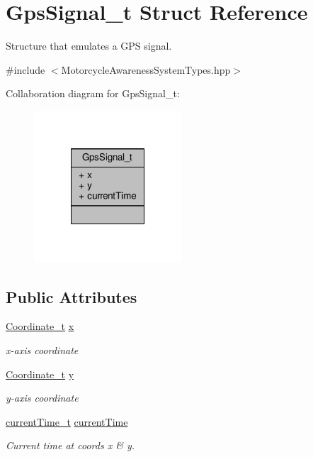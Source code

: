 \hypertarget{structGpsSignal__t}{\section{Gps\-Signal\-\_\-t Struct Reference}
\label{structGpsSignal__t}
}


Structure that emulates a G\-P\-S signal.  




{\ttfamily \#include $<$Motorcycle\-Awareness\-System\-Types.\-hpp$>$}



Collaboration diagram for Gps\-Signal\-\_\-t\-:\nopagebreak
\begin{figure}[H]
\begin{center}
\leavevmode
\includegraphics[width=156pt]{structGpsSignal__t__coll__graph}
\end{center}
\end{figure}
\subsection*{Public Attributes}
\begin{DoxyCompactItemize}
\item 
\hyperlink{MotorcycleAwarenessSystemTypes_8hpp_ae989615510617e9b0ad39dcd343c78fb}{Coordinate\-\_\-t} \hyperlink{structGpsSignal__t_a6f7bd3c500b55923ab335ada4b6b26eb}{x}
\begin{DoxyCompactList}\small\item\em x-\/axis coordinate \end{DoxyCompactList}\item 
\hyperlink{MotorcycleAwarenessSystemTypes_8hpp_ae989615510617e9b0ad39dcd343c78fb}{Coordinate\-\_\-t} \hyperlink{structGpsSignal__t_ab9e083be189fc842ed7aa4fdc978e94e}{y}
\begin{DoxyCompactList}\small\item\em y-\/axis coordinate \end{DoxyCompactList}\item 
\hyperlink{MotorcycleAwarenessSystemTypes_8hpp_a75ae168a2dad22557428f696df806a76}{current\-Time\-\_\-t} \hyperlink{structGpsSignal__t_abc96245129f39c6e51e8bfe955f2047e}{current\-Time}
\begin{DoxyCompactList}\small\item\em Current time at coords x \& y. \end{DoxyCompactList}\end{DoxyCompactItemize}


